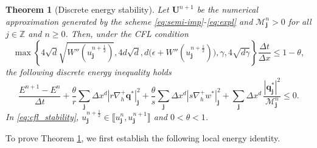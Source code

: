 \documentclass[11pt]{article}
\numberwithin{equation}{section}
\newtheorem{theorem} {Theorem}[section]
\newtheorem{counter example}[theorem]{Counter Example}
\numberwithin{equation}{section}
\numberwithin{equation}{section}
\newcommand{\half}{\frac{1}{2}}
\begin{document}
\begin{theorem}[Discrete energy stability]
\label{thm:eng-stable}
Let $\mathbf{U}^{n+1}$ be the numerical approximation generated by the scheme
\eqref{eq:semi-imp}-\eqref{eq:expl} and $\mathcal{M}_{\mathbf{j}}^n>0$ for all $j\in \mathbb{Z}$ and $n\geq 0$. Then, under the CFL condition
\begin{equation}
\label{eq:cfl_stability}
\max\left\{
4\sqrt{d}\sqrt{W''(u_{\mathbf{j}}^{n+\frac12})},
4d\sqrt{d},
d\big(\epsilon+W''(u_{\mathbf{j}}^{n+\frac12})\big),
\gamma,
4\sqrt{d\gamma}
\right\}
\frac{\Delta t}{\Delta x}
\leq 1-\theta,
\end{equation}
the following discrete energy inequality holds
\begin{equation}
    \label{eq:disc_energy-ineq}
    \frac{E^{n+1}-E^{n}}{\Delta t}
    +\frac{\theta}{r}\sum_{\mathbf{j}}\Delta x^d|r\nabla_h^{+}\mathbf{q}^*|_{\mathbf{j}}^2+\frac{\theta}{s}\sum_{\mathbf{j}}\Delta x^d|s\nabla_h^+ w^*|_{\mathbf{j}}^2+
    \sum_{\mathbf{j}}\Delta x^d\,
    \frac{|\mathbf{q}_{\mathbf{j}}^*|^2}{\mathcal{M}_{\mathbf{j}}^n}
    \leq 0.
\end{equation}
In \eqref{eq:cfl_stability}, $u^{n+\half}_{\mathbf{j}}\in\llbracket u_{\mathbf{j}}^n, u_{\mathbf{j}}^{n+1}\rrbracket$ and $0<\theta<1$.
\end{theorem}
To prove Theorem \ref{thm:eng-stable}, we first establish the following local energy identity.
\end{document}

